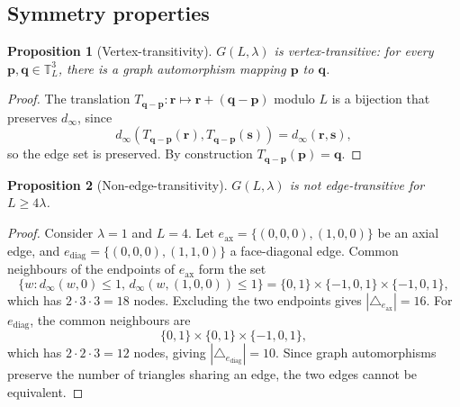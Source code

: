 \documentclass[aps,pre,onecolumn,10pt,groupedaddress,amsmath,amssymb,floatfix]{revtex4-2}
\newtheorem{proposition}{Proposition}
\begin{document}
\subsection{Symmetry properties}

\begin{proposition}[Vertex-transitivity]
\label{prop:vertex-trans}
$G(L, \lambda)$ is vertex-transitive: for every $\mathbf{p}, \mathbf{q} \in \mathbb{T}^3_L$, there is a graph automorphism mapping $\mathbf{p}$ to $\mathbf{q}$.
\end{proposition}
\begin{proof}
The translation $T_{\mathbf{q}-\mathbf{p}}: \mathbf{r} \mapsto \mathbf{r} + (\mathbf{q}-\mathbf{p})$ modulo $L$ is a bijection that preserves $d_\infty$, since
\[
d_\infty(T_{\mathbf{q}-\mathbf{p}}(\mathbf{r}), T_{\mathbf{q}-\mathbf{p}}(\mathbf{s})) = d_\infty(\mathbf{r}, \mathbf{s}),
\]
so the edge set is preserved. By construction $T_{\mathbf{q}-\mathbf{p}}(\mathbf{p}) = \mathbf{q}$.
\end{proof}

\begin{proposition}[Non-edge-transitivity]
\label{prop:not-edge-trans}
$G(L, \lambda)$ is not edge-transitive for $L \ge 4\lambda$.
\end{proposition}
\begin{proof}
Consider $\lambda = 1$ and $L = 4$. Let $e_{\text{ax}} = \{(0,0,0), (1,0,0)\}$ be an axial edge, and $e_{\text{diag}} = \{(0,0,0), (1,1,0)\}$ a face-diagonal edge. Common neighbours of the endpoints of $e_{\text{ax}}$ form the set
\[
\{w : d_\infty(w, 0) \le 1, \, d_\infty(w, (1,0,0)) \le 1\} = \{0,1\} \times \{-1,0,1\} \times \{-1,0,1\},
\]
which has $2 \cdot 3 \cdot 3 = 18$ nodes. Excluding the two endpoints gives $|\triangle_{e_{\text{ax}}}| = 16$. For $e_{\text{diag}}$, the common neighbours are
\[
\{0,1\} \times \{0,1\} \times \{-1,0,1\},
\]
which has $2 \cdot 2 \cdot 3 = 12$ nodes, giving $|\triangle_{e_{\text{diag}}}| = 10$. Since graph automorphisms preserve the number of triangles sharing an edge, the two edges cannot be equivalent.
\end{proof}
\end{document}
